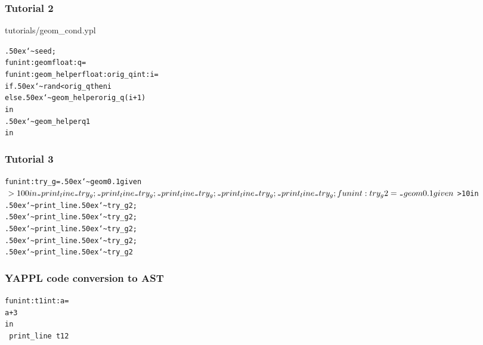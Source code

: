 \documentclass[xcolor=dvipsnames]{beamer}
\newcommand\midtilde{{\lower.50ex\hbox{\texttt{\char`\~}}}}
\begin{document}
\begin{frame}[fragile]
\frametitle{Tutorial 2}
tutorials/geom\_cond.ypl
\begin{alltt}
 {\midtilde}seed;
 fun int:geom float:q =
   fun int:geom_helper float:orig_q int:i =
     if {\midtilde}rand < orig_q then i
     else {\midtilde}geom_helper orig_q (i+1)
   in 
     {\midtilde}geom_helper q 1
 in
\end{alltt}
\end{frame}

\begin{frame}[fragile]
\frametitle{Tutorial 3}
\begin{alltt}
 fun int:try_g = {\midtilde}geom 0.1 given $ > 100 in
 {\midtilde}print_line {\midtilde}try_g;
 {\midtilde}print_line {\midtilde}try_g;
 {\midtilde}print_line {\midtilde}try_g;
 {\midtilde}print_line {\midtilde}try_g;
 {\midtilde}print_line {\midtilde}try_g;
 
 fun int:try_g2 = {\midtilde}geom 0.1 given $ > 10 in
 {\midtilde}print_line {\midtilde}try_g2;
 {\midtilde}print_line {\midtilde}try_g2;
 {\midtilde}print_line {\midtilde}try_g2;
 {\midtilde}print_line {\midtilde}try_g2;
 {\midtilde}print_line {\midtilde}try_g2
\end{alltt}
\end{frame}


\begin{frame}[fragile] 
\frametitle{YAPPL code conversion to AST}
\begin{alltt} 
fun int:t1 int:a =
    a + 3
in
~print_line ~t1 2 
\end{alltt}

\end{frame}
\end{document}
